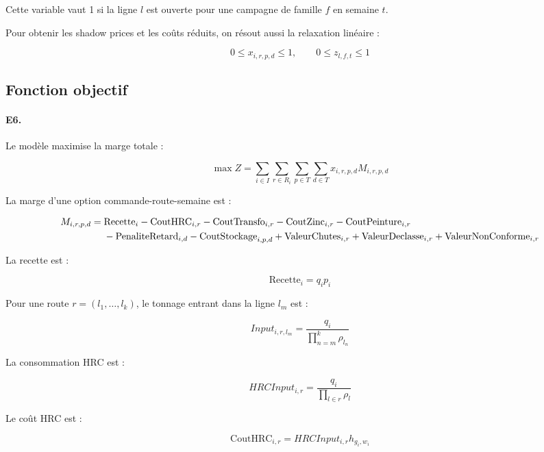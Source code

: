 \documentclass[12pt,a4paper]{article}
\newcommand{\question}[1]{\paragraph{\textcolor{blue!50!black}{#1.}}}
\begin{document}
Cette variable vaut 1 si la ligne $l$ est ouverte pour une campagne de famille $f$ en semaine $t$.

Pour obtenir les shadow prices et les coûts réduits, on résout aussi la relaxation linéaire :

\begin{equation}
0 \leq x_{i,r,p,d} \leq 1, \qquad 0 \leq z_{l,f,t} \leq 1
\end{equation}

\subsection{Fonction objectif}

\question{E6}
Le modèle maximise la marge totale :

\begin{equation}
\max Z = \sum_{i\in I}\sum_{r\in R_i}\sum_{p\in T}\sum_{d\in T}
x_{i,r,p,d} M_{i,r,p,d}
\end{equation}

La marge d'une option commande-route-semaine est :

\begin{align}
M_{i,r,p,d} ={}&
\text{Recette}_i
- \text{CoutHRC}_{i,r}
- \text{CoutTransfo}_{i,r}
- \text{CoutZinc}_{i,r}
- \text{CoutPeinture}_{i,r} \notag\\
&- \text{PenaliteRetard}_{i,d}
- \text{CoutStockage}_{i,p,d}
+ \text{ValeurChutes}_{i,r}
+ \text{ValeurDeclasse}_{i,r}
+ \text{ValeurNonConforme}_{i,r}
\end{align}

La recette est :

\begin{equation}
\text{Recette}_i = q_i p_i
\end{equation}

Pour une route $r=(l_1,\ldots,l_k)$, le tonnage entrant dans la ligne $l_m$ est :

\begin{equation}
Input_{i,r,l_m} =
\frac{q_i}{\prod_{n=m}^{k}\rho_{l_n}}
\end{equation}

La consommation HRC est :

\begin{equation}
HRCInput_{i,r} =
\frac{q_i}{\prod_{l\in r}\rho_l}
\end{equation}

Le coût HRC est :

\begin{equation}
\text{CoutHRC}_{i,r} =
HRCInput_{i,r} h_{g_i,w_i}
\end{equation}
\end{document}
